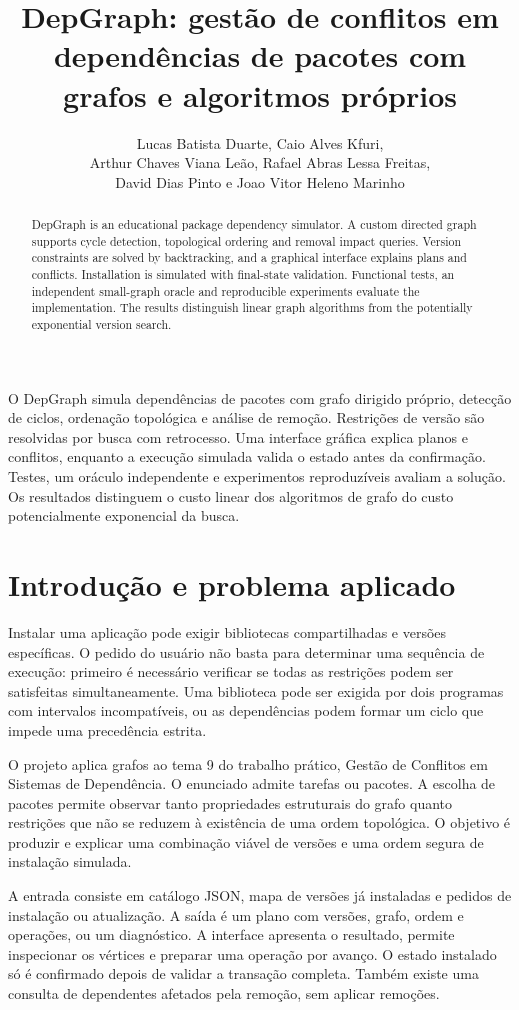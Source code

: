 \documentclass[12pt]{article}
\title{DepGraph: gestão de conflitos em dependências de pacotes com grafos e algoritmos próprios}
\author{Lucas Batista Duarte, Caio Alves Kfuri,\\ Arthur Chaves Viana Leão, Rafael Abras Lessa Freitas,\\ David Dias Pinto e Joao Vitor Heleno Marinho}
\begin{document}
\maketitle
\begin{abstract}
DepGraph is an educational package dependency simulator. A custom directed graph supports cycle detection, topological ordering and removal impact queries. Version constraints are solved by backtracking, and a graphical interface explains plans and conflicts. Installation is simulated with final-state validation. Functional tests, an independent small-graph oracle and reproducible experiments evaluate the implementation. The results distinguish linear graph algorithms from the potentially exponential version search.
\end{abstract}
\begin{resumo}
O DepGraph simula dependências de pacotes com grafo dirigido próprio, detecção de ciclos, ordenação topológica e análise de remoção. Restrições de versão são resolvidas por busca com retrocesso. Uma interface gráfica explica planos e conflitos, enquanto a execução simulada valida o estado antes da confirmação. Testes, um oráculo independente e experimentos reproduzíveis avaliam a solução. Os resultados distinguem o custo linear dos algoritmos de grafo do custo potencialmente exponencial da busca.
\end{resumo}
\clearpage
\section{Introdução e problema aplicado}
Instalar uma aplicação pode exigir bibliotecas compartilhadas e versões específicas. O pedido do usuário não basta para determinar uma sequência de execução: primeiro é necessário verificar se todas as restrições podem ser satisfeitas simultaneamente. Uma biblioteca pode ser exigida por dois programas com intervalos incompatíveis, ou as dependências podem formar um ciclo que impede uma precedência estrita.

O projeto aplica grafos ao tema 9 do trabalho prático, Gestão de Conflitos em Sistemas de Dependência. O enunciado admite tarefas ou pacotes. A escolha de pacotes permite observar tanto propriedades estruturais do grafo quanto restrições que não se reduzem à existência de uma ordem topológica. O objetivo é produzir e explicar uma combinação viável de versões e uma ordem segura de instalação simulada.

A entrada consiste em catálogo JSON, mapa de versões já instaladas e pedidos de instalação ou atualização. A saída é um plano com versões, grafo, ordem e operações, ou um diagnóstico. A interface apresenta o resultado, permite inspecionar os vértices e preparar uma operação por avanço. O estado instalado só é confirmado depois de validar a transação completa. Também existe uma consulta de dependentes afetados pela remoção, sem aplicar remoções.
\end{document}
